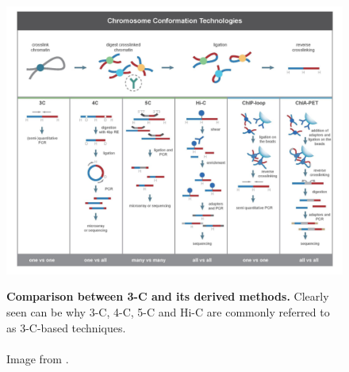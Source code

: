 
\begin{figure}[t]
\begin{centering}
    {\includegraphics[scale=0.75]{figures/background/Chromosome_conformation_techniques.jpg}}
    \caption[Comparison between 3-C and its derived methods]
    {\textbf{Comparison between 3-C and its derived methods.}
    Clearly seen can be why 3-C, 4-C, 5-C and Hi-C are commonly referred to as
    3-C-based techniques.
    \\ \\ Image from \cite{Li2014}.}
    \label{fig:comparison3C}\label{fig:cct}
\end{centering}
\end{figure}



